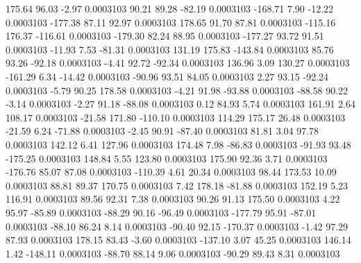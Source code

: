       175.64       96.03       -2.97     0.0003103
       90.21       89.28      -82.19     0.0003103
     -168.71        7.90      -12.22     0.0003103
     -177.38       87.11       92.97     0.0003103
      178.65       91.70       87.81     0.0003103
     -115.16      176.37     -116.61     0.0003103
     -179.30       82.24       88.95     0.0003103
     -177.27       93.72       91.51     0.0003103
      -11.93        7.53      -81.31     0.0003103
      131.19      175.83     -143.84     0.0003103
       85.76       93.26      -92.18     0.0003103
       -4.41       92.72      -92.34     0.0003103
      136.96        3.09      130.27     0.0003103
     -161.29        6.34      -14.42     0.0003103
      -90.96       93.51       84.05     0.0003103
        2.27       93.15      -92.24     0.0003103
       -5.79       90.25      178.58     0.0003103
       -4.21       91.98      -93.88     0.0003103
      -88.58       90.22       -3.14     0.0003103
       -2.27       91.18      -88.08     0.0003103
        0.12       84.93        5.74     0.0003103
      161.91        2.64      108.17     0.0003103
      -21.58      171.80     -110.10     0.0003103
      114.29      175.17       26.48     0.0003103
      -21.59        6.24      -71.88     0.0003103
       -2.45       90.91      -87.40     0.0003103
       81.81        3.04       97.78     0.0003103
      142.12        6.41      127.96     0.0003103
      174.48        7.98      -86.83     0.0003103
      -91.93       93.48     -175.25     0.0003103
      148.84        5.55      123.80     0.0003103
      175.90       92.36        3.71     0.0003103
     -176.76       85.07       87.08     0.0003103
     -110.39        4.61       20.34     0.0003103
       98.44      173.53       10.09     0.0003103
       88.81       89.37      170.75     0.0003103
        7.42      178.18      -81.88     0.0003103
      152.19        5.23      116.91     0.0003103
       89.56       92.31        7.38     0.0003103
       90.26       91.13      175.50     0.0003103
        4.22       95.97      -85.89     0.0003103
      -88.29       90.16      -96.49     0.0003103
     -177.79       95.91      -87.01     0.0003103
      -88.10       86.24        8.14     0.0003103
      -90.40       92.15     -170.37     0.0003103
       -1.42       97.29       87.93     0.0003103
      178.15       83.43       -3.60     0.0003103
     -137.10        3.07       45.25     0.0003103
      146.14        1.42     -148.11     0.0003103
      -88.70       88.14        9.06     0.0003103
      -90.29       89.43        8.31     0.0003103
